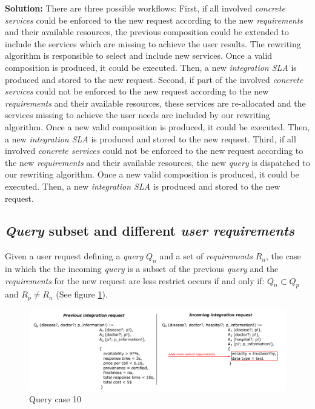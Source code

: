 \bigskip
\noindent \textbf{Solution:} There are three possible workflows: First, if all involved \textsl{concrete services} could be enforced to the new request according to the new \textsl{requirements} and their available resources, the previous composition could be extended to include the services which are missing to achieve the user results. The rewriting algorithm is responsible to select and include new services. Once a valid composition is produced, it could be executed. Then, a new \textsl{integration SLA} is produced and stored to the new request. Second, if part of the involved \textsl{concrete services} could not be enforced to the new request according to the new \textsl{requirements} and their available resources, these services are re-allocated and the services missing to achieve the user needs are included by our rewriting algorithm. Once a new valid composition is produced, it could be executed. Then, a new \textsl{integration SLA} is produced and stored to the new request. Third, if all involved \textsl{concrete services} could not be enforced to the new request according to the new \textsl{requirements} and their available resources, the new \textsl{query} is dispatched to our rewriting algorithm. Once a new valid composition is produced, it could be executed. Then, a new \textsl{integration SLA} is produced and stored to the new request.

\subsection{\textsl{Query} subset and different \textsl{user requirements}}
Given a user request defining a \textsl{query} $Q_{n}$ and a set of \textsl{requirements} $R_{n}$, the case in which the the incoming \textsl{query} is a subset of the previous \textsl{query} and the \textsl{requirements} for the new request are less restrict occurs if and only if: $Q_{n} \subset Q_{p}$ and $R_{p} \neq R_{n}$ (See figure \ref{fig:case10}).

\begin{figure}[h!]
\center
\includegraphics[scale=0.85]{figures/query-case-10.pdf}\caption{Query case 10} \label{fig:case10}
\end{figure}


